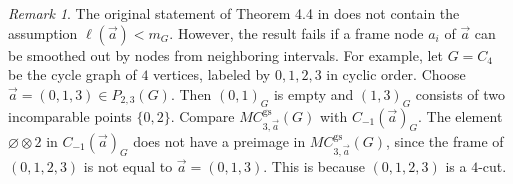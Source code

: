 \documentclass{amsart}
\numberwithin{equation}{section}
\theoremstyle{plain}
\theoremstyle{remark}
\newtheorem{rem}[thm]{Remark}
\theoremstyle{definition}
\numberwithin{equation}{section}
\newcommand{\gs}{\mathrm{gs}}
\begin{document}
\begin{rem}
    The original statement of Theorem 4.4 in \cite{Kaneta2021} does not contain the assumption $\ell(\Vec{a})<m_G$.
    However, the result fails if a frame node $a_i$ of $\Vec{a}$ can be smoothed out by nodes from neighboring intervals. For example, let $G=C_4$ be the cycle graph of $4$ vertices, labeled by $0,1,2,3$ in cyclic order. Choose $\Vec{a}=(0,1,3)\in P_{2,3}(G)$. Then $(0,1)_G$ is empty and $(1,3)_G$ consists of two incomparable points $\{0,2\}$. Compare $MC^{\gs}_{3,\Vec{a}}(G)$ with $C_{-1}(\Vec{a})_G$. The element $\varnothing\otimes 2$ in $C_{-1}(\Vec{a})_G$ does not have a preimage in $MC^{\gs}_{3,\Vec{a}}(G)$, since the frame of $(0,1,2,3)$ is not equal to $\Vec{a}=(0,1,3)$.
    This is because $(0,1,2,3)$ is a $4$-cut. 
\end{rem}
\end{document}
